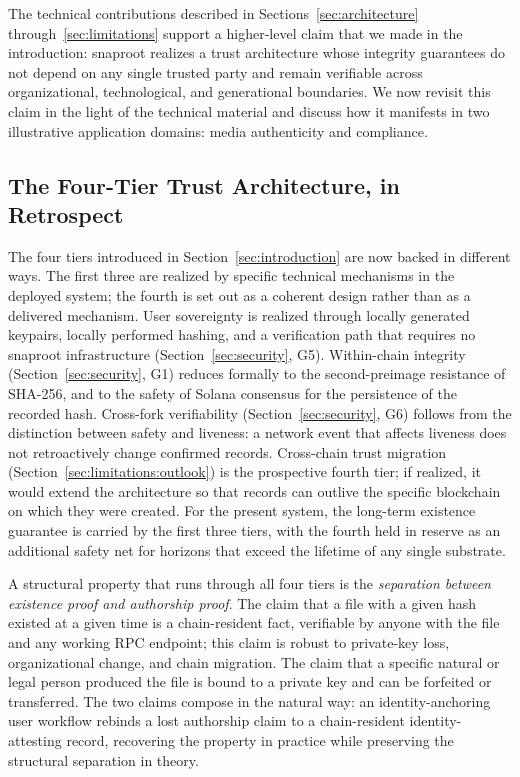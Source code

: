 \documentclass[11pt,a4paper]{article}
\begin{document}
The technical contributions described in Sections~\ref{sec:architecture}
through~\ref{sec:limitations} support a higher-level claim that we made
in the introduction: snaproot realizes a trust architecture whose
integrity guarantees do not depend on any single trusted party and
remain verifiable across organizational, technological, and generational
boundaries. We now revisit this claim in the light of the technical
material and discuss how it manifests in two illustrative application
domains: media authenticity and compliance.

\subsection{The Four-Tier Trust Architecture, in Retrospect}

The four tiers introduced in Section~\ref{sec:introduction} are now
backed in different ways. The first three are realized by specific
technical mechanisms in the deployed system; the fourth is set out as
a coherent design rather than as a delivered mechanism. User
sovereignty is realized through locally generated keypairs, locally
performed hashing, and a verification path that requires no snaproot
infrastructure (Section~\ref{sec:security}, G5). Within-chain integrity
(Section~\ref{sec:security}, G1) reduces formally to the second-preimage
resistance of SHA-256, and to the safety of Solana consensus for the
persistence of the recorded hash. Cross-fork verifiability
(Section~\ref{sec:security}, G6) follows from the distinction between
safety and liveness: a network event that affects liveness does not
retroactively change confirmed records. Cross-chain trust migration
(Section~\ref{sec:limitations:outlook}) is the prospective fourth tier;
if realized, it would extend the architecture so that records can
outlive the specific blockchain on which they were created. For the
present system, the long-term existence guarantee is carried by the
first three tiers, with the fourth held in reserve as an additional
safety net for horizons that exceed the lifetime of any single
substrate.

A structural property that runs through all four tiers is the
\emph{separation between existence proof and authorship proof}. The
claim that a file with a given hash existed at a given time is a
chain-resident fact, verifiable by anyone with the file and any working
RPC endpoint; this claim is robust to private-key loss, organizational
change, and chain migration. The claim that a specific natural or
legal person produced the file is bound to a private key and can be
forfeited or transferred. The two claims compose in the natural way:
an identity-anchoring user workflow rebinds a lost authorship claim
to a chain-resident identity-attesting record, recovering the property
in practice while preserving the structural separation in theory.
\end{document}
